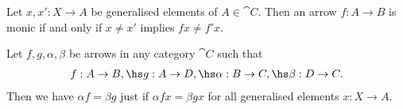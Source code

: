 \documentclass{article}
\begin{document}
\begin{lemma}
    Let $x,x': X\to A$ be generalised elements of $A\in\cat C$. Then an arrow
    $f:A\to B$ is monic if and only if $x\not=x'$ implies $fx\not=f'x$.
\end{lemma}

\begin{lemma}
    Let $f,g,\alpha,\beta$ be arrows in any category $\cat C$ such that
    \begin{align*}
        f:A\to B,\hs g:A\to D,\hs \alpha:B\to C,\hs \beta:D\to C.
    \end{align*}
    Then we have $\alpha f=\beta g$ just if $\alpha f x = \beta g x$ for all generalised
    elements $x:X\to A$.
\end{lemma}
\end{document}
